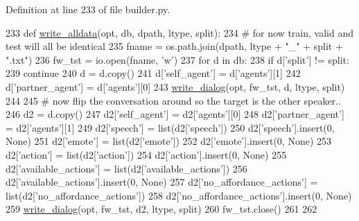Definition at line 233 of file builder.\+py.


\begin{DoxyCode}
233 \textcolor{keyword}{def }\hyperlink{namespaceparlai_1_1tasks_1_1light__dialog_1_1builder_aeb144d0ebd2fd1727f73677e36f2c8b5}{write\_alldata}(opt, db, dpath, ltype, split):
234     \textcolor{comment}{# for now train, valid and test will all be identical}
235     fname = os.path.join(dpath, ltype + \textcolor{stringliteral}{"\_"} + split + \textcolor{stringliteral}{".txt"})
236     fw\_tst = io.open(fname, \textcolor{stringliteral}{'w'})
237     \textcolor{keywordflow}{for} d \textcolor{keywordflow}{in} db:
238         \textcolor{keywordflow}{if} d[\textcolor{stringliteral}{'split'}] != split:
239             \textcolor{keywordflow}{continue}
240         d = d.copy()
241         d[\textcolor{stringliteral}{'self\_agent'}] = d[\textcolor{stringliteral}{'agents'}][1]
242         d[\textcolor{stringliteral}{'partner\_agent'}] = d[\textcolor{stringliteral}{'agents'}][0]
243         \hyperlink{namespaceparlai_1_1tasks_1_1light__dialog_1_1builder_a233ecce0ba4b1a0c023e855629986d69}{write\_dialog}(opt, fw\_tst, d, ltype, split)
244 
245         \textcolor{comment}{# now flip the conversation around so the target is the other speaker..}
246         d2 = d.copy()
247         d2[\textcolor{stringliteral}{'self\_agent'}] = d2[\textcolor{stringliteral}{'agents'}][0]
248         d2[\textcolor{stringliteral}{'partner\_agent'}] = d2[\textcolor{stringliteral}{'agents'}][1]
249         d2[\textcolor{stringliteral}{'speech'}] = list(d2[\textcolor{stringliteral}{'speech'}])
250         d2[\textcolor{stringliteral}{'speech'}].insert(0, \textcolor{keywordtype}{None})
251         d2[\textcolor{stringliteral}{'emote'}] = list(d2[\textcolor{stringliteral}{'emote'}])
252         d2[\textcolor{stringliteral}{'emote'}].insert(0, \textcolor{keywordtype}{None})
253         d2[\textcolor{stringliteral}{'action'}] = list(d2[\textcolor{stringliteral}{'action'}])
254         d2[\textcolor{stringliteral}{'action'}].insert(0, \textcolor{keywordtype}{None})
255         d2[\textcolor{stringliteral}{'available\_actions'}] = list(d2[\textcolor{stringliteral}{'available\_actions'}])
256         d2[\textcolor{stringliteral}{'available\_actions'}].insert(0, \textcolor{keywordtype}{None})
257         d2[\textcolor{stringliteral}{'no\_affordance\_actions'}] = list(d2[\textcolor{stringliteral}{'no\_affordance\_actions'}])
258         d2[\textcolor{stringliteral}{'no\_affordance\_actions'}].insert(0, \textcolor{keywordtype}{None})
259         \hyperlink{namespaceparlai_1_1tasks_1_1light__dialog_1_1builder_a233ecce0ba4b1a0c023e855629986d69}{write\_dialog}(opt, fw\_tst, d2, ltype, split)
260     fw\_tst.close()
261 
262 
\end{DoxyCode}
\mbox{\label{namespaceparlai_1_1tasks_1_1light__dialog_1_1builder_a233ecce0ba4b1a0c023e855629986d69}} 
